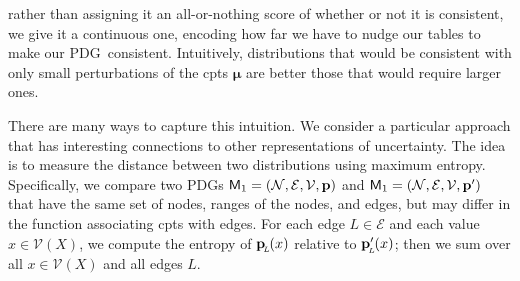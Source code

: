 \documentclass{article}
\newcommand{\bmu}{\boldsymbol{\mu}}
\newcommand{\bp}[1][L]{\mat{p}_{\!_#1\!}}
\newcommand{\V}{\mathcal V}
\newcommand{\N}{\mathcal N}
\newcommand{\Ed}{\mathcal E}
\newcommand{\sfM}{\mathsf M}
\newcommand{\MN}{PDG}
\numberwithin{equation}{section}
\begin{document}
	rather than assigning it an all-or-nothing score of whether or
        not it is consistent, we give it a continuous one, encoding
        how far we have to nudge our tables to make our
        \MN\ consistent. Intuitively, distributions that would be
        consistent with only small perturbations of the cpts $\bmu$
        are better those that would require larger ones.  
        
        There are many ways to capture this intuition.  We consider a
particular approach that has interesting connections to other
representations  of uncertainty.  The idea is to measure the distance
between two distributions using maximum entropy.  Specifically, we
compare two PDGs $\sfM_1 = (\N, \Ed, \V, \mat p)$ and $\sfM_1 = (\N,
\Ed, \V, \mat p')$ 
that have the same set of nodes, ranges of the nodes,
and edges, but may differ in the function associating cpts with
edges.  For each edge $L \in \Ed$ and each value $x \in \V(X)$, we
compute the entropy of $\bp(x)$ relative to
$\bp'(x)$; then we sum over all $x \in \V(X)$ and all edges
$L$. 
\end{document}
